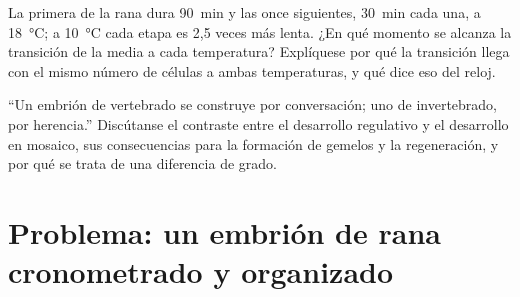 \begin{exercise}[$\star\star\star$]\label{exo:b2:vertebrate-development:11}
La primera  de la rana dura \qty{90}{min} y las once
siguientes, \qty{30}{min} cada una, a \qty{18}{\celsius}; a
\qty{10}{\celsius} cada etapa es 2,5 veces más lenta. ¿En qué momento se
alcanza la transición de la  media a cada temperatura?
Explíquese por qué la transición llega con el mismo número de células a
ambas temperaturas, y qué dice eso del reloj.
\end{exercise}

\begin{exercise}[$\star\star\star$]\label{exo:b2:vertebrate-development:12}
``Un embrión de vertebrado se construye por conversación; uno de
invertebrado, por herencia.'' Discútanse el contraste entre el desarrollo
regulativo y el desarrollo en mosaico, sus consecuencias para la
formación de gemelos y la regeneración, y por qué se trata de una
diferencia de grado.
\end{exercise}

\section{Problema: un embrión de rana cronometrado y organizado}

